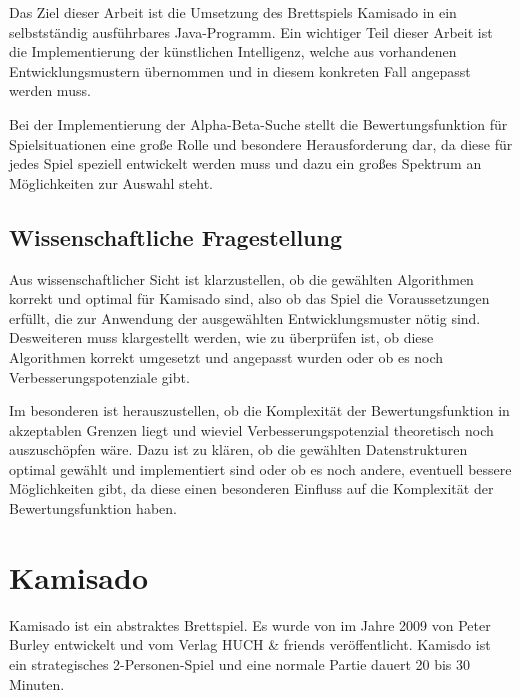 \documentclass[
	12pt,
	halfparskip,
	a4paper,
	abstract,
	bibliography=totoc,
	liststotoc
]{scrreprt}
\begin{document}
Das Ziel dieser Arbeit ist die Umsetzung des Brettspiels Kamisado in ein selbstständig ausführbares Java-Programm. Ein wichtiger Teil dieser Arbeit ist die Implementierung der künstlichen Intelligenz, welche aus vorhandenen Entwicklungsmustern übernommen und in diesem konkreten Fall angepasst werden muss.

Bei der Implementierung der Alpha-Beta-Suche stellt die Bewertungsfunktion für Spielsituationen eine große Rolle und besondere Herausforderung dar, da diese für jedes Spiel speziell entwickelt werden muss und dazu ein großes Spektrum an Möglichkeiten zur Auswahl steht.

\section{Wissenschaftliche Fragestellung}

Aus wissenschaftlicher Sicht ist klarzustellen, ob die gewählten Algorithmen korrekt und optimal für Kamisado sind, also ob das Spiel die Voraussetzungen erfüllt, die zur Anwendung der ausgewählten Entwicklungsmuster nötig sind. Desweiteren muss klargestellt werden, wie zu überprüfen ist, ob diese Algorithmen korrekt umgesetzt und angepasst wurden oder ob es noch Verbesserungspotenziale gibt.

Im besonderen ist herauszustellen, ob die Komplexität der Bewertungsfunktion in akzeptablen Grenzen liegt und wieviel Verbesserungspotenzial theoretisch noch auszuschöpfen wäre. Dazu ist zu klären, ob die gewählten Datenstrukturen optimal gewählt und implementiert sind oder ob es noch andere, eventuell bessere Möglichkeiten gibt, da diese einen besonderen Einfluss auf die Komplexität der Bewertungsfunktion haben.

\chapter{Kamisado}

Kamisado ist ein abstraktes Brettspiel. Es wurde von im Jahre 2009 von Peter Burley entwickelt und vom Verlag HUCH \& friends veröffentlicht. Kamisdo ist ein strategisches 2-Personen-Spiel und eine normale Partie dauert 20 bis 30 Minuten. \citep{spieletest}
\end{document}
